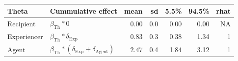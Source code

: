 
\begin{tabular}[t]{llrrrrr}
\toprule
Theta & Cummulative effect & mean & sd & 5.5\% & 94.5\% & rhat\\
\midrule
Recipient & $\beta_{\text{Th}} * 0$ & 0.00 & 0.0 & 0.00 & 0.00 & NA\\
Experiencer & $\beta_{\text{Th}} * \delta_{\text{Exp}}$ & 0.83 & 0.3 & 0.38 & 1.34 & 1\\
Agent & $\beta_{\text{Th}} * (\delta_{\text{Exp}} + \delta_{\text{Agent}})$ & 2.47 & 0.4 & 1.84 & 3.12 & 1\\
\bottomrule
\end{tabular}
